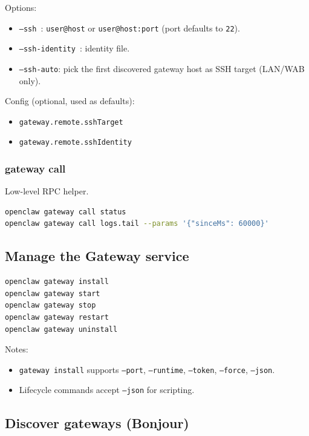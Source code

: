 Options:

\begin{itemize}
  \item \texttt{--ssh }: \texttt{user@host} or \texttt{user@host:port} (port defaults to \texttt{22}).
  \item \texttt{--ssh-identity }: identity file.
  \item \texttt{--ssh-auto}: pick the first discovered gateway host as SSH target (LAN/WAB only).
\end{itemize}


Config (optional, used as defaults):

\begin{itemize}
  \item \texttt{gateway.remote.sshTarget}
  \item \texttt{gateway.remote.sshIdentity}
\end{itemize}


\subsubsection{gateway call }


Low-level RPC helper.

\begin{lstlisting}[language=bash]
openclaw gateway call status
openclaw gateway call logs.tail --params '{"sinceMs": 60000}'
\end{lstlisting}


\subsection{Manage the Gateway service}


\begin{lstlisting}[language=bash]
openclaw gateway install
openclaw gateway start
openclaw gateway stop
openclaw gateway restart
openclaw gateway uninstall
\end{lstlisting}


Notes:

\begin{itemize}
  \item \texttt{gateway install} supports \texttt{--port}, \texttt{--runtime}, \texttt{--token}, \texttt{--force}, \texttt{--json}.
  \item Lifecycle commands accept \texttt{--json} for scripting.
\end{itemize}


\subsection{Discover gateways (Bonjour)}


